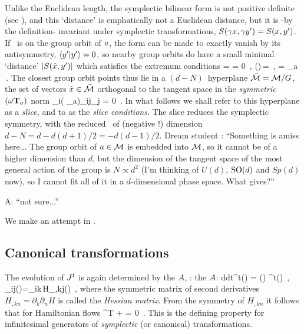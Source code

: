 {{Unlike the Euclidean length, the symplectic bilinear form is not positive
definite (see ), and this `distance' is emphatically not
a Euclidean distance, but it is -by the definition- invariant under symplectic
transformations, $S(\gamma x,\gamma{\ensuremath{y'}})=S(x,{y'})$. If
\slicep\ is on the group orbit of $a$, the form can be made to exactly
vanish by its antisymmetry, $\braket{\slicep}{\slicep} = 0$, so nearby
group orbits do have a small minimal `distance' $|S(\hat{x},{y'})|$
which satisfies the extremum conditions
\beq
{} \braket{\ssp}{\LieEl(\gSpace)\,\slicep}
   =
   = 0
    \,,\qquad
\LieEl(\gSpace)\,\sspRed = \ssp
    \,,\qquad
{} = \Lg_a \slicep
\,.
The closest group orbit points thus lie in a $(d\!-\!N)$\dmn\ hyperplane
$\bar{\cal M} = {\cal M}/G$, the set of vectors $\hat{x} \in  \bar{\cal M}$
orthogonal to the {\template} tangent space in the
\emph{symmetric} $({\bf \omega} \mathbf{T}_a)$ norm
\beq
\sspRed_i({\bf \omega} \Lg_a)_{ij}\slicep_{j} = 0
\,.
In what follows we shall refer to this hyperplane as a \emph{slice,} and
to   as the \emph{slice conditions}. The slice
reduces the symplectic symmetry, with the reduced \statesp\ of
(negative !) dimension
$d-N  =  d - {d(d+1)}/{2} = - d(d-1)/2$.
    } %
\noindent
Dream student \student:
``Something is amiss here... The group orbit of $a \in {\cal M}$ is embedded
into ${\cal M}$, so it cannot be of a higher dimension than $d$, but the dimension of
the tangent space of the most general
action of the group is $N \propto d^2$ (I'm thinking of $U(d)$, $\textrm{SO}(d)$ and
$Sp(d)$ now), so I cannot fit all of it in a $d$-dimensional phase space.
What gives?''

\noindent
A: ``not sure...''

We make an attempt in .
    }%

\subsection{Canonical transformations}
\label{sect:CanonTransf}

The
evolution of $J^t$
    \ifdasbuch
{}
    \else
    \fi
is again determined by
    \ifdasbuch
the {\stabmat} $A$, :
    \else
the {\stabmat} $A$:
    \fi
\beq
{d\over dt}\jMps^t(\pSpace) = \Mvar(\pSpace)
\jMps^t(\pSpace)
\,, \qquad
\Mvar_{ij}(\pSpace)={\omega}_{ik}\,H_{,kj}(\pSpace)
\,,
where the symmetric matrix of second derivatives
$H_{,kn} = \partial_k \partial_n H$
is called the {\em Hessian matrix}.
From
the symmetry of $H_{,kn}$
it follows that for Hamiltonian flows 
\beq
 \Mvar^T {\bf \omega} + {\bf \omega} \Mvar = 0
\,.
This is the defining property  for infinitesimal
generators of {\em symplectic} (or canonical) transformations.

